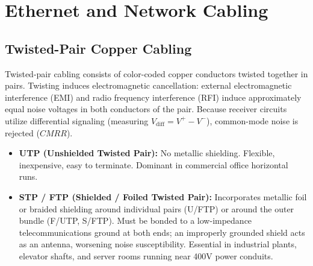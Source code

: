 \section{Ethernet and Network Cabling}

\subsection{Twisted-Pair Copper Cabling}
Twisted-pair cabling consists of color-coded copper conductors twisted together in pairs. Twisting induces electromagnetic cancellation: external electromagnetic interference (EMI) and radio frequency interference (RFI) induce approximately equal noise voltages in both conductors of the pair. Because receiver circuits utilize differential signaling (measuring $V_{\text{diff}} = V^+ - V^-$), common-mode noise is rejected ($CMRR$).

\begin{keyconcept}
\begin{itemize}[leftmargin=*]
    \item \textbf{UTP (Unshielded Twisted Pair):} No metallic shielding. Flexible, inexpensive, easy to terminate. Dominant in commercial office horizontal runs.
    \item \textbf{STP / FTP (Shielded / Foiled Twisted Pair):} Incorporates metallic foil or braided shielding around individual pairs (U/FTP) or around the outer bundle (F/UTP, S/FTP). Must be bonded to a low-impedance telecommunications ground at both ends; an improperly grounded shield acts as an antenna, worsening noise susceptibility. Essential in industrial plants, elevator shafts, and server rooms running near 400V power conduits.
\end{itemize}
\end{keyconcept}

